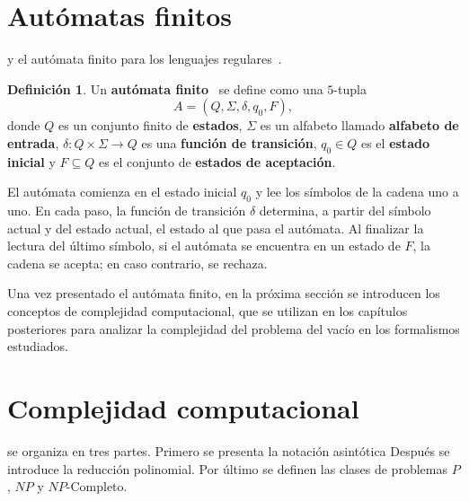 \documentclass{article}
\theoremstyle{definition}
\newtheorem{definicion}{Definición}
\theoremstyle{plain}
\theoremstyle{remark}
\begin{document}
\section{Autómatas finitos}
\label{sec:automatas}

 y el autómata finito para los lenguajes
regulares~\cite{hopcroft2006introduction}.

\begin{definicion}
  Un \textbf{autómata finito}~\cite{hopcroft2006introduction} se define
  como una $5$-tupla
  \[
    A = (Q, \Sigma, \delta, q_0, F),
  \]
  donde $Q$ es un conjunto finito de \textbf{estados}, $\Sigma$ es un
  alfabeto llamado \textbf{alfabeto de entrada},
  $\delta : Q \times \Sigma \to Q$ es una \textbf{función de transición},
  $q_0 \in Q$ es el \textbf{estado inicial} y $F \subseteq Q$ es el
  conjunto de \textbf{estados de aceptación}.
\end{definicion}

El autómata comienza en el estado inicial $q_0$ y lee los símbolos de la
cadena uno a uno. En cada paso, la función de transición $\delta$
determina, a partir del símbolo actual y del estado actual, el estado al
que pasa el autómata. Al finalizar la lectura del último símbolo, si el
autómata se encuentra en un estado de $F$, la cadena se acepta; en caso
contrario, se rechaza.

Una vez presentado el autómata finito, en la próxima sección se
introducen los conceptos de complejidad computacional, que se utilizan
en los capítulos posteriores para analizar la complejidad del problema
del vacío en los formalismos estudiados.

\section{Complejidad computacional}
\label{sec:complejidad}

 se organiza en tres partes. Primero se presenta la
notación asintótica Después se introduce la reducción polinomial.
Por último se definen las clases de problemas $P$, $NP$ y
$NP$-Completo.
\end{document}
